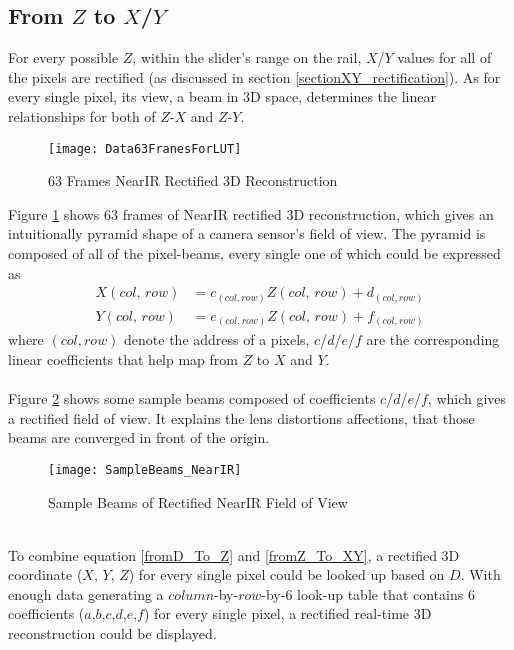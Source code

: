 \subsection{From \(Z\) to \(X\)/\(Y\)}
For every possible \(Z\), within the slider's range on the rail, \(X\)/\(Y\) values for all of the pixels are rectified (as discussed in section \ref{sectionXY_rectification}). As for every single pixel, its view, a beam in 3D space, determines the linear relationships for both of \(Z\)-\(X\) and \(Z\)-\(Y\).
%
\begin{figure}[h]
\centering
\texttt{[image: Data63FranesForLUT]}
\caption{63 Frames NearIR Rectified 3D Reconstruction}
\label{Data63FranesForLUT}
\end{figure}%
%
Figure \ref{Data63FranesForLUT} shows 63 frames of NearIR rectified 3D reconstruction, which gives an intuitionally pyramid shape of a camera sensor's field of view. The pyramid is composed of all of the pixel-beams, every single one of which could be expressed as \\%
%
\begin{equation}
%
\begin{aligned}
X(col, \, row) &= c_{(col, row)}Z(col, \, row)+d_{(col, row)}
\\%
Y(col, \, row) &= e_{(col, row)}Z(col, \, row)+f_{(col, row)}
\end{aligned}
\label{fromZ_To_XY}
%
\end{equation}%
%
where \({(col, row)}\) denote the address of a pixels, \(c\)/\(d\)/\(e\)/\(f\) are the corresponding linear coefficients that help map from \(Z\) to \(X\) and \(Y\).%
\\\\%
Figure \ref{SampleBeams_NearIR} shows some sample beams composed of coefficients \(c\)/\(d\)/\(e\)/\(f\), which gives a rectified field of view. It explains the lens distortions affections, that those beams are converged in front of the origin.\\%
%
\begin{figure}[h]
\centering
\texttt{[image: SampleBeams\_NearIR]}
\caption{Sample Beams of Rectified NearIR Field of View}
\label{SampleBeams_NearIR}
\end{figure}%
\\%
To combine equation \ref{fromD_To_Z} and \ref{fromZ_To_XY}, a rectified 3D coordinate (\(X\), \(Y\), \(Z\)) for every single pixel could be looked up based on \(D\). With enough data generating a  \(column\)-by-\(row\)-by-\(6\)  look-up table that contains 6 coefficients (\(a\),\(b\),\(c\),\(d\),\(e\),\(f\)) for every single pixel, a rectified real-time 3D reconstruction could be displayed.
%
